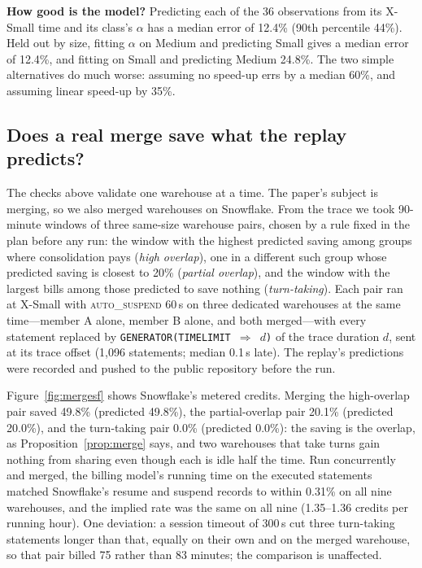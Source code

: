 \documentclass[conference]{IEEEtran}
\newcommand{\autos}{\textsc{auto\_suspend}}
\begin{document}
\textbf{How good is the model?} Predicting each of the 36 observations from its X-Small time and its class's $\alpha$ has a
median error of 12.4\% (90th percentile 44\%). Held out by size, fitting $\alpha$ on Medium and predicting Small gives a
median error of 12.4\%, and fitting on Small and predicting Medium 24.8\%. The two simple alternatives do much worse:
assuming no speed-up errs by a median 60\%, and assuming linear speed-up by 35\%.

\subsection{Does a real merge save what the replay predicts?}\label{sec:merge}
The checks above validate one warehouse at a time. The paper's subject is merging, so we also merged warehouses on
Snowflake. From the trace we took 90-minute windows of three same-size warehouse pairs, chosen by a rule fixed in the plan
before any run: the window with the highest predicted saving among groups where consolidation pays (\emph{high overlap}),
one in a different such group whose predicted saving is closest to 20\% (\emph{partial overlap}), and the window with the
largest bills among those predicted to save nothing (\emph{turn-taking}). Each pair ran at X-Small with \autos{} 60\,s on
three dedicated warehouses at the same time---member A alone, member B alone, and both merged---with every statement
replaced by \texttt{GENERATOR(TIMELIMIT~$\Rightarrow$~$d$)} of the trace duration $d$, sent at its trace offset (1,096
statements; median 0.1\,s late). The replay's predictions were recorded and pushed to the public repository before the run.

Figure~\ref{fig:mergesf} shows Snowflake's metered credits. Merging the high-overlap pair saved 49.8\% (predicted
49.8\%), the partial-overlap pair 20.1\% (predicted 20.0\%), and the turn-taking pair 0.0\% (predicted 0.0\%): the saving
is the overlap, as Proposition~\ref{prop:merge} says, and two warehouses that take turns gain nothing from sharing even
though each is idle half the time. Run concurrently and merged, the billing model's running time on the executed
statements matched Snowflake's resume and suspend records to within 0.31\% on all nine warehouses, and the implied rate
was the same on all nine (1.35--1.36 credits per running hour). One deviation: a session timeout of 300\,s cut three
turn-taking statements longer than that, equally on their own and on the merged warehouse, so that pair billed 75 rather
than 83 minutes; the comparison is unaffected.
\end{document}
